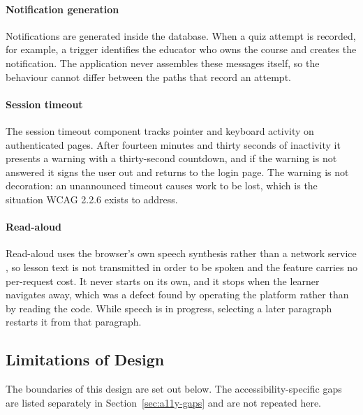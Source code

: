 \documentclass[12pt, oneside]{article} %
\begin{document}
\paragraph{Notification generation}

Notifications are generated inside the database. When a quiz attempt is recorded, for example, a trigger identifies the educator who owns the course and creates the notification. The application never assembles these messages itself, so the behaviour cannot differ between the paths that record an attempt.

\paragraph{Session timeout}

The session timeout component tracks pointer and keyboard activity on authenticated pages. After fourteen minutes and thirty seconds of inactivity it presents a warning with a thirty-second countdown, and if the warning is not answered it signs the user out and returns to the login page. The warning is not decoration: an unannounced timeout causes work to be lost, which is the situation WCAG 2.2.6 exists to address.

\paragraph{Read-aloud}

Read-aloud uses the browser's own speech synthesis rather than a network service \cite{webspeech_api}, so lesson text is not transmitted in order to be spoken and the feature carries no per-request cost. It never starts on its own, and it stops when the learner navigates away, which was a defect found by operating the platform rather than by reading the code. While speech is in progress, selecting a later paragraph restarts it from that paragraph.

\subsection{Limitations of Design}
\label{sec:design-limitations}

The boundaries of this design are set out below. The accessibility-specific gaps are listed separately in Section~\ref{sec:a11y-gaps} and are not repeated here.
\end{document}
